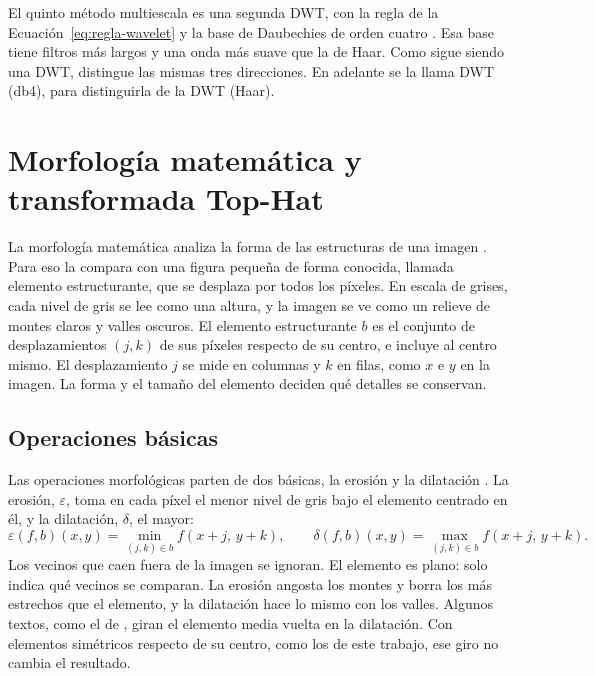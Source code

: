 El quinto método multiescala es una segunda DWT, con la regla de la
Ecuación~\eqref{eq:regla-wavelet} y la base de Daubechies de orden cuatro \parencite{daubechies1988}. Esa base tiene filtros más
largos y una onda más suave que la de Haar. Como sigue siendo una DWT, distingue las mismas tres
direcciones. En adelante se la llama DWT (db4), para distinguirla de la DWT (Haar).

\section{Morfología matemática y transformada Top-Hat}
\label{sec:morfologia}

La morfología matemática analiza la forma de las estructuras de una imagen \parencite{serra1982}. Para
eso la compara con una figura pequeña de forma conocida, llamada elemento estructurante, que se desplaza
por todos los píxeles. En escala de grises, cada nivel de gris se lee como una altura, y la imagen se ve
como un relieve de montes claros y valles oscuros. El elemento estructurante $b$ es el conjunto de
desplazamientos $(j,k)$ de sus píxeles respecto de su centro, e incluye al centro mismo. El
desplazamiento $j$ se mide en columnas y $k$ en filas, como $x$ e $y$ en la imagen. La forma y el tamaño
del elemento deciden qué detalles se conservan.

\subsection{Operaciones básicas}

Las operaciones morfológicas parten de dos básicas, la erosión y la dilatación
\parencite{soille2003, gonzalez2018}. La erosión, $\varepsilon$, toma en cada píxel el menor nivel de
gris bajo el elemento centrado en él, y la dilatación, $\delta$, el mayor:
\begin{equation} \varepsilon(f,b)(x,y) = \min_{(j,k)\in b} f(x+j,\, y+k), \qquad \delta(f,b)(x,y) = \max_{(j,k)\in b} f(x+j,\, y+k). \label{eq:erosion-dilatacion} \end{equation}
Los vecinos que caen fuera de la imagen se ignoran. El elemento es plano: solo indica qué vecinos se
comparan. La erosión angosta los montes y borra los más estrechos que el elemento, y la dilatación hace
lo mismo con los valles. Algunos textos, como el de \textcite{gonzalez2018}, giran el elemento media
vuelta en la dilatación. Con elementos simétricos respecto de su centro, como los de este trabajo, ese
giro no cambia el resultado.

